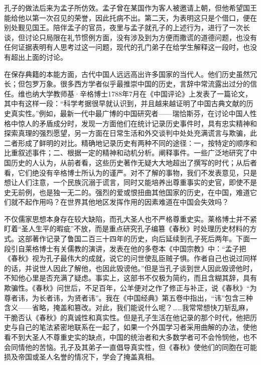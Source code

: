 \documentclass[12pt,oneside]{book}
\begin{document}
\begin{common-format}
孔子的做法后来为孟子所仿效。孟子曾在某国作为客人被邀请上朝，但他希望国王能给他以第一次召见的荣誉，因此托病不出。第二天，为表明这只是个借口，便在别处觐见国王。陪伴孟子的官员，夜里与孟子就孔子的上述行为，进行了一次长谈，但讨论只局限在礼节惯例方面，没有涉及到为方便而撒谎的道德问题，也没有任何证据表明有人思考过这一问题，现代的孔门弟子在给学生解释这一段时，也没有超出上面的讨论。 

在保存典籍的本能方面，古代中国人远远高出许多国家的当代人。他们历史虽然冗长；但包罗万象。很多西方学者似乎最推崇中国的历史，言辞中常流露出过分的信任。维也纳大学教师基·辛格博士1788年7月在《中国评论》上发表了一篇论文，其中有这样一段：“科学考据很早就认识到，并且越来越证明了中国古典文献的历史真实性。”例如，最新一代中最广博的中国研究者——瑞恰斯芬，在讨论中国人性格中惊人的矛盾成分时，发现一方面他们在统计记录历史事件时，具有忠实精神和探索真理的强烈愿望，另一方面在日常生活和外交谈判中处处充满谎言与欺骗，此二者形成了鲜明的对比。精确地记录历史有两种不同的途径：一，按特定的顺序和比重叙述事件；二、根据一定的精神和动机分析。阐释事件。一些广泛地研究了中国历史的人认为，从前者看，这些历史著作无疑大大地超出了撰写的时代；从后者看，它们绝没有辛格博士所认为的谨严。对不了解的事物，我们不发表意见，只是想让人们注意，一个民族沉溺于谎言，同时又能培养出尊重事实的史官，即使不是史无前例，也是独一无二的。强烈的爱或恨扭曲其他国家的历史，在中国，难道它们就不起作用吗？在世界其他地区发挥作用的因素难道在中国会失效吗？ 

不仅儒家思想本身存在较大缺陷，而孔大圣人也不严格尊重史实。莱格博士并不紧盯着“圣人生平的暇疵”不放，而是重点研究孔子编篡《春秋》时处理历史材料的方式。这部著作记录了鲁国二百三十四年的历史，向后延续到孔子死后两年。下面一段引自莱格博士有关儒教的演讲，发表在他的多卷本《中国宗教》中：“孟子把《春秋》视为孔子最伟大的成就，说它的问世使乱臣贼子惧。作者自己也说过同样的话，并说世人因此了解他，也因此毁谤他。”但是当孔子谈到世人因此毁谤他时，不知他心里是否充满了疑虑。事实上，这部书不仅极为简约，而且含糊其辞，具有欺骗性。《春秋》问世后，不足百年，公羊便对之作了修正与补正，说《春秋》“为尊者讳，为长者讳，为贤者讳”。我在《中国经典》第五卷中指出，“讳”包含三种含义——省略，掩盖和篡改。对此，我们能说什么呢？……我常常想快刀斩乱麻，干脆否认《春秋》的真诚性和真实性。但是孔子生活在他记录的那个时代，他把历史与自己的笔法紧密地联系在一起了，如果一个外国学习者采用曲解的办法，使他看不到大圣人不尊重史实的缺点，中国的统治者和大多数学者可不会怜悯他，也不会同情他的苦恼。孔子及其弟子一直倡导真实性，但《春秋》使他们的同胞在可能损及帝国或圣人名誉的情况下，学会了掩盖真相。 


\end{common-format}
\end{document}
